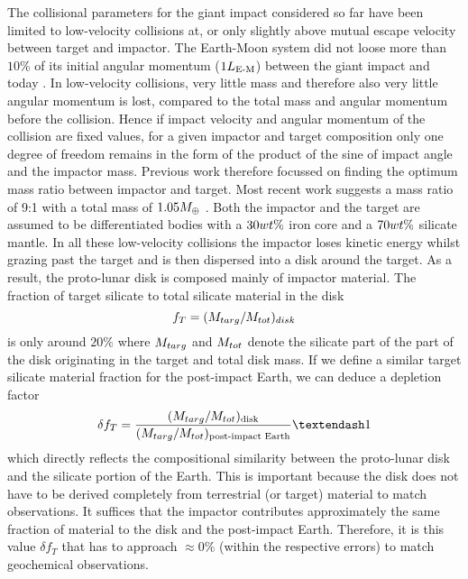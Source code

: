 The collisional parameters for the giant impact considered so far have been limited to low-velocity collisions at, or only slightly above mutual escape velocity between target and impactor. The Earth-Moon system did not loose more than $10\%$ of its initial angular momentum ($1 L_{\textrm{E-M}}$) between the giant impact and today \citep{Canup:2001p3295}. In low-velocity collisions, very little mass and therefore also very little angular momentum is lost, compared to the total mass and angular momentum before the collision. Hence if impact velocity and angular momentum of the collision are fixed values, for a given impactor and target composition only one degree of freedom remains in the form of the product of the sine of impact angle and the impactor mass. Previous work therefore focussed on finding the optimum mass ratio between impactor and target. Most recent work suggests a mass ratio of 9:1 with a total mass of $1.05 M_{\oplus}$  \citep{Canup:2004p115}. Both the impactor and the target are assumed to be differentiated bodies with a $30 wt\mathrm{\%}$ iron core and a $70 wt\mathrm{\%}$ silicate mantle. In all these low-velocity collisions the impactor loses kinetic energy whilst grazing past the target and is then dispersed into a disk around the target. As a result, the proto-lunar disk is composed mainly of impactor material. The fraction of target silicate to total silicate material in the disk
\begin{equation}
f_T = (M_{targ} / M_{tot})_{disk}
\end{equation}
is only around $20\%$ where $M_{targ}$ and $M_{tot}$ denote the silicate part of the part of the disk originating in the target and total disk mass. If we define a similar target silicate material fraction for the post-impact Earth, we can deduce a depletion factor
\begin{equation}
\delta f_{T} = \frac{ (\Mtar / \Mtot)_{\textrm{disk}} }{ (\Mtar / \Mtot)_{\textrm{post-impact Earth} } }– 1
\end{equation}
which directly reflects the compositional similarity between the proto-lunar disk and the silicate portion of the Earth. This is important because the disk does not have to be derived completely from terrestrial (or target) material to match observations. It suffices that  the impactor contributes approximately the same fraction of material to the disk and the post-impact Earth. Therefore, it is this value $\delta f_{T}$ that has to approach $\approx 0\%$ (within the respective errors) to match geochemical observations.

